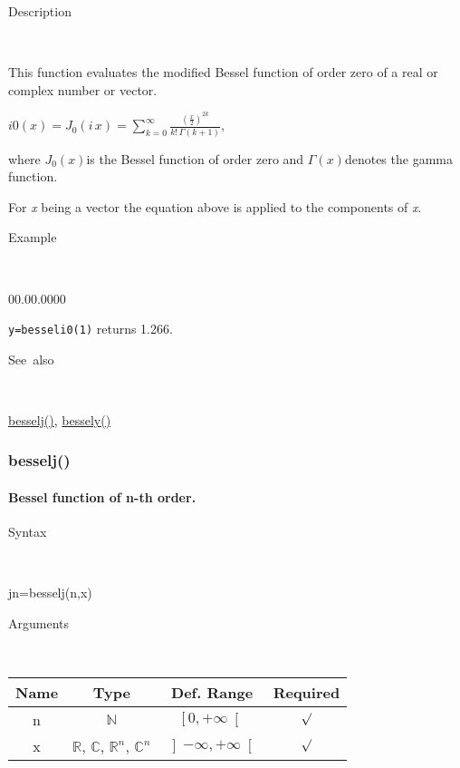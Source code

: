 \begin{description}
\item [Description]~
\end{description}
This function evaluates the modified Bessel function of order zero
of a real or complex number or vector.

\medskip{}
$i0\left(x\right)=J_{0}\left(i\, x\right)={\displaystyle \sum\limits _{k=0}^{\infty}\frac{\left(\frac{x}{2}\right)^{2k}}{k!\,\Gamma\left(k+1\right)}}$,
\medskip{}

where $J_{0}\left(x\right)$is the Bessel function of order zero and
$\Gamma\left(x\right)$denotes the gamma function.
\medskip{}

\noindent For \textit{x} being a vector the equation above is applied
to the components of \textit{x}.

\begin{description}
\item [Example]~
\end{description}
\begin{lyxlist}{00.00.0000}
\item [\texttt{y=besseli0(1)}]returns 1.266.
\end{lyxlist}
\begin{description}
\item [See~also]~
\end{description}
\textcolor{blue}{\hyperlink{besselj}{besselj()}}\textcolor{black}{,}
\textcolor{blue}{\hyperlink{bessely}{bessely()}}


\newpage
\subsubsection*{\hypertarget{besselj}{}{\Large besselj()}}


\paragraph{\label{par:Bessel-function}Bessel function of n-th order.}

\begin{description}
\item [Syntax]~
\end{description}
jn=besselj(n,x)

\begin{description}
\item [Arguments]~
\end{description}
\begin{tabular}{|c|c|c|c|}
\hline 
Name&
Type&
Def. Range&
Required\tabularnewline
\hline
\hline 
n&
$\mathbb{N}$&
$\left[0,+\infty\right[$&
$\surd$\tabularnewline
\hline
x&
$\mathbb{R}$, $\mathbb{C}$, $\mathbb{R}^{n}$, $\mathbb{C}^{n}$&
$\left]-\infty,+\infty\right[$&
$\surd$\tabularnewline
\hline
\end{tabular}

